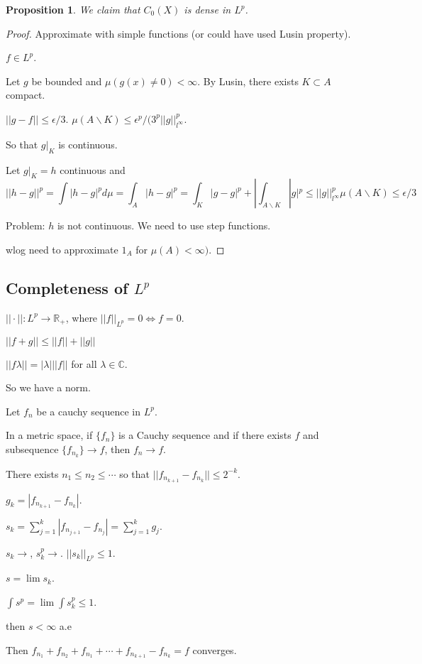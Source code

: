 \documentclass[11pt]{article}
\newtheorem{prop}[thm]{Proposition}
\newcommand{\cd}{\cdots}
\newcommand{\Lra}{\Leftrightarrow}
\newcommand{\ra}{\rightarrow}
\newcommand{\sbs}{\subset}
\newcommand{\bs}{\backslash}
\newcommand{\ep}{\epsilon}
\newcommand{\la}{\lambda}
\newcommand{\su}[2]{\sum_{#1}^{#2}}
\newcommand{\re}{\mathbb{R}}
\newcommand{\co}{\mathbb{C}}
\begin{document}
\begin{prop}
We claim that $C_0(X)$ is dense in $L^p$. 
\end{prop}
\begin{proof}
Approximate with simple functions (or could have used Lusin property). 

$f\in L^p$. 

Let $g$ be bounded and $\mu(g(x)\neq 0)<\infty$. By Lusin, there exists $K\sbs A$ compact. 

$||g-f||\le \ep/3$. $\mu(A\bs K)\le \ep^p/(3^p||g||_{l^{\infty}}^p$. 

So that $g|_K$ is continuous. 

Let $g|_K=h$ continuous and 
\[||h-g||^p=\int|h-g|^pd\mu=\int_A|h-g|^p=\int_K|g-g|^p+|\int_{A\bs K}|g|^p\le||g||^p_{l^{\infty}}\mu(A\bs K)\le \ep/3\]

Problem: $h$ is not continuous. We need to use step functions. 

wlog need to approximate $1_A$ for $\mu(A)<\infty)$. 

\end{proof}

\subsection{Completeness of $L^p$} 

$||\cdot||:L^p\ra\re_+$, where $||f||_{L^p}=0\Lra f=0$. 

$||f+g||\le ||f||+||g||$

$||f\la||=|\la|||f||$ for all $\la\in\co$. 

So we have a norm. 

Let $f_n$ be a cauchy sequence in $L^p$. 


In a metric space, if $\{f_n\}$ is a Cauchy sequence and if there exists $f$ and subsequence $\{f_{n_k}\}\ra f$, then $f_n\ra f$. 

There exists $n_1\le n_2\le\cd$ so that $||f_{n_{k+1}}-f_{n_k}||\le 2^{-k}$. 

$g_k=|f_{n_{k+1}}-f_{n_k}|$. 

$s_k=\su{j=1}{k}|f_{n_{j+1}}-f_{n_j}|=\su{j=1}{k}g_j$. 

$s_k\ra$, $s_k^p\ra$. $||s_k||_{L^p}\le 1$. 

$s=\lim s_k$. 

$\int s^p=\lim\int s_k^p\le 1$. 

then $s<\infty$ a.e

Then $f_{n_1}+f_{n_2}+f_{n_1}+\cd+f_{n_{k+1}}-f_{n_k}=f$ converges. 
\end{document}
